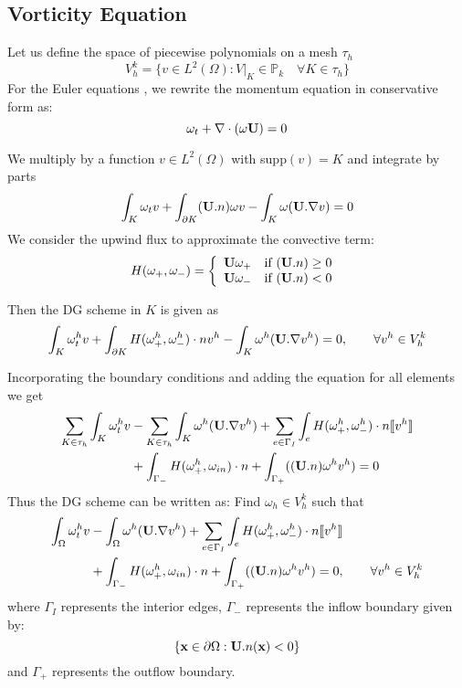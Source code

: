 \documentclass[11pt]{article}
\begin{document}
\subsection{Vorticity Equation}
Let us define the space of piecewise polynomials on a mesh $\tau_h$
$$
V_h^k=\lbrace v\in L^2(\Omega):V|_K\in\mathbb{P}_k\quad\forall K\in\tau_h\rbrace
$$
For the Euler equations , we rewrite the momentum equation in conservative form as:
$$
\omega_t+\nabla\cdot(\omega{\bf{U}})=0
$$

We multiply by a function $v\in L^2(\Omega)$ with supp$(v)=K$ and integrate by parts
$$
\int_K\omega_t{v}+\int_{\partial{K}}({\bf{U}}.n)\omega{v}-\int_K\omega({\bf{U}}.\nabla{v})=0
$$
We consider the upwind flux to approximate the convective term:
\[
  H(\omega_+,\omega_-) = 
  \left\{ 
  \begin{array}{l l}
    {\bf{U}}\omega_+ &  \text{if $({\bf{U}}.n)\geq 0$ }\\
    {\bf{U}}\omega_- &  \text{if $({\bf{U}}.n)< 0$ }\\
  \end{array} \right.
\]

Then the DG scheme in $K$ is given as
\begin{equation}\label{sds}
\int_K\omega_t^h{v}+\int_{\partial{K}}H(\omega_+^h,\omega_-^h)\cdot{n}v^h-\int_K\omega^h({{\bf{U}}}.\nabla{v^h})=0,\qquad\forall v^h \in V_h^k
\end{equation}

Incorporating the boundary conditions and adding the equation for all elements we get
\begin{equation}
\begin{aligned}
\displaystyle{\sum_{K\in\tau_h}}\int_K\omega_t^h{v}
&-\displaystyle{\sum_{K\in\tau_h}}\int_K\omega^h({{\bf{U}}}.\nabla{v^h})
+\displaystyle{\sum_{e\in\Gamma_I}}\int_e H(\omega_+^h,\omega_-^h)\cdot{n}\text{\textlbrackdbl{$v^h$}\textrbrackdbl}\\
&+\int_{\Gamma_-}H(\omega_+^h,\omega_{in})\cdot{n}
+\int_{\Gamma_+}(({\bf{U}}.n)\omega^h{v^h})=0
\end{aligned}
\end{equation}
Thus the DG scheme can be written as: Find $\omega_h\in V_h^k$ such that
\begin{equation}\label{vor1}
\begin{aligned}
\int_\Omega\omega_t^h{v}
&-\int_\Omega\omega^h({{\bf{U}}}.\nabla{v^h})
+\displaystyle{\sum_{e\in\Gamma_I}}\int_e H(\omega_+^h,\omega_-^h)\cdot{n}\text{\textlbrackdbl{$v^h$}\textrbrackdbl}\\
&+\int_{\Gamma_-}H(\omega_+^h,\omega_{in})\cdot{n}
+\int_{\Gamma_+}(({\bf{U}}.n)\omega^h{v^h})=0, \qquad\forall v^h \in V_h^k
\end{aligned}
\end{equation}
where $\Gamma_I$ represents the interior edges, $\Gamma_-$ represents the inflow boundary given by:
$$ \lbrace\textbf{x}\in\partial{\Omega}:{\bf{U}}.n(\textbf{x})<0\rbrace
$$
and $\Gamma_+$ represents the outflow boundary.\\
\end{document}
